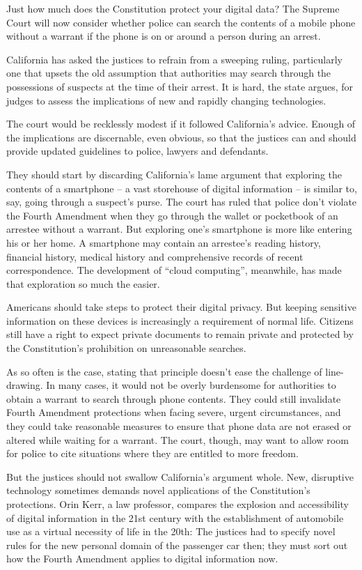 Just how much does the Constitution protect your digital data? The Supreme Court will now consider whether police can search the contents of a mobile phone without a warrant if the phone is on or around a person during an arrest.


California has asked the justices to refrain from a sweeping ruling, particularly one that upsets the old assumption that authorities may search through the possessions of suspects at the time of their arrest. It is hard, the state argues, for judges to assess the implications of new and rapidly changing technologies.


The court would be recklessly modest if it followed California's advice. Enough of the implications are discernable, even obvious, so that the justices can and should provide updated guidelines to police, lawyers and defendants.


They should start by discarding California's lame argument that exploring the contents of a smartphone – a vast storehouse of digital information – is similar to, say, going through a suspect's purse. The court has ruled that police don't violate the Fourth Amendment when they go through the wallet or pocketbook of an arrestee without a warrant. But exploring one's smartphone is more like entering  his or her home. A smartphone may contain an arrestee's reading history, financial history, medical history and comprehensive records of recent correspondence. The development of ``cloud computing'', meanwhile, has made that exploration so much the easier.


Americans should take steps to protect their digital privacy. But keeping sensitive information on these devices is increasingly a requirement of normal life. Citizens still have a right to expect private documents to remain private and protected by the Constitution's prohibition on unreasonable searches.


As so often is the case, stating that principle doesn't ease the challenge of line-drawing. In many cases, it would not be overly burdensome for authorities to obtain a warrant to search through phone contents. They could still invalidate Fourth Amendment protections when facing severe, urgent circumstances, and they could take reasonable measures to ensure that phone data are not erased or altered while waiting for a warrant. The court, though, may want to allow room for police to cite situations where they are entitled to more freedom.


But the justices should not swallow California's argument whole. New, disruptive technology sometimes demands novel applications of the Constitution's protections. Orin Kerr, a law professor, compares the explosion and accessibility of digital information in the 21st century with the establishment of automobile use as a virtual necessity of life in the 20th: The justices had to specify novel rules for the new personal domain of the passenger car then; they must sort out how the Fourth Amendment applies to digital information now.


